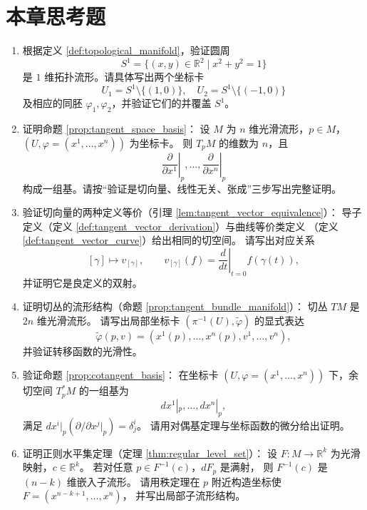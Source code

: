 \section*{本章思考题}

\begin{enumerate}[leftmargin=3em, label=\textbf{题 \arabic*}]
    \item 根据定义 \ref{def:topological_manifold}，验证圆周
    \[
    S^1=\{(x,y)\in\mathbb{R}^2\mid x^2+y^2=1\}
    \]
    是 $1$ 维拓扑流形。请具体写出两个坐标卡
    \[
    U_1=S^1\setminus\{(1,0)\},\quad U_2=S^1\setminus\{(-1,0)\}
    \]
    及相应的同胚 $\varphi_1,\varphi_2$，并验证它们的并覆盖 $S^1$。

    \item 证明命题 \ref{prop:tangent_space_basis}：
    设 $M$ 为 $n$ 维光滑流形，$p\in M$，$(U,\varphi=(x^1,\dots,x^n))$ 为坐标卡。
    则 $T_pM$ 的维数为 $n$，且
    \[
    \left.\frac{\partial}{\partial x^1}\right|_p,\dots,
    \left.\frac{\partial}{\partial x^n}\right|_p
    \]
    构成一组基。请按“验证是切向量、线性无关、张成”三步写出完整证明。

    \item 验证切向量的两种定义等价（引理 \ref{lem:tangent_vector_equivalence}）：
    导子定义（定义 \ref{def:tangent_vector_derivation}）与曲线等价类定义
    （定义 \ref{def:tangent_vector_curve}）给出相同的切空间。
    请写出对应关系
    \[
    [\gamma]\mapsto v_{[\gamma]},\qquad
    v_{[\gamma]}(f)=\left.\frac{d}{dt}\right|_{t=0}f(\gamma(t)),
    \]
    并证明它是良定义的双射。

    \item 证明切丛的流形结构（命题 \ref{prop:tangent_bundle_manifold}）：
    切丛 $TM$ 是 $2n$ 维光滑流形。
    请写出局部坐标卡 $(\pi^{-1}(U),\tilde{\varphi})$ 的显式表达
    \[
    \tilde{\varphi}(p,v)=(x^1(p),\dots,x^n(p),v^1,\dots,v^n),
    \]
    并验证转移函数的光滑性。

    \item 验证命题 \ref{prop:cotangent_basis}：
    在坐标卡 $(U,\varphi=(x^1,\dots,x^n))$ 下，余切空间 $T_p^*M$ 的一组基为
    \[
    dx^1|_p,\dots,dx^n|_p,
    \]
    满足 $dx^i|_p(\partial/\partial x^j|_p)=\delta_j^i$。
    请用对偶基定理与坐标函数的微分给出证明。

    \item 证明正则水平集定理（定理 \ref{thm:regular_level_set}）：
    设 $F:M\to\mathbb{R}^k$ 为光滑映射，$c\in\mathbb{R}^k$。
    若对任意 $p\in F^{-1}(c)$，$dF_p$ 是满射，
    则 $F^{-1}(c)$ 是 $(n-k)$ 维嵌入子流形。
    请用秩定理在 $p$ 附近构造坐标使 $F=(x^{n-k+1},\dots,x^n)$，
    并写出局部子流形结构。


\end{enumerate}
